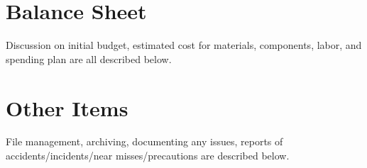 \documentclass[12pt]{article}
\begin{document}
	\newpage
	
	\section{Balance Sheet}
	Discussion on initial budget, estimated cost for materials, components, labor, and spending plan are all described below.
		
	\newpage				
						
	\section{Other Items}
	File management, archiving, documenting any issues, reports of accidents/incidents/near misses/precautions are described below.
\end{document}
